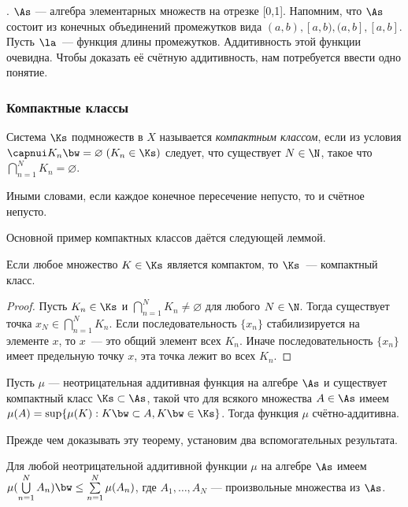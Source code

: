 \documentclass[10pt]{article}
\begin{document}
. $\As$ --- алгебра элементарных множеств на отрезке [0,1].
Напомним, что $\As$ состоит из конечных объединений промежутков вида
$(a,b),[a,b),(a,b],[a,b]$. Пусть $\la$~--- функция длины
промежутков. Аддитивность этой функции очевидна. Чтобы доказать её
счётную аддитивность, нам потребуется ввести одно понятие.

\subsubsection{Компактные классы}

\begin{df}
Система $\Ks$ подмножеств в $X$ называется \emph{компактным
классом}, если из условия $\capnui K_n\bw =\varnothing\;
(K_n\in\Ks)$ следует, что существует $N\in\N$, такое что
$\bigcap\limits_{n=1}^N K_n =\varnothing$.
\end{df}
Иными словами, если каждое конечное пересечение непусто, то и
счётное непусто.

Основной пример компактных классов даётся следующей леммой.

\begin{lemma}Если любое множество $K\in\Ks$ является компактом, то
$\Ks$~--- компактный класс.
\end{lemma}

\begin{proof}
Пусть $K_n\in\Ks$ и $\bigcap\limits_{n=1}^N K_n\ne\varnothing$ для
любого $N\in\N$. Тогда существует точка
$x_N\in\bigcap\limits_{n=1}^N K_n$. Если последовательность
$\{x_n\}$ стабилизируется на элементе $x$, то $x$~--- это общий
элемент всех $K_n$. Иначе последовательность $\{x_n\}$ имеет
предельную точку $x$, эта точка лежит во всех $K_n$.
\end{proof}

\begin{theorem}\label{inf_add_comp}
Пусть $\mu$ --- неотрицательная аддитивная функция на алгебре $\As$
и существует компактный класс $\Ks\subset\As$, такой что для всякого
множества $A\in\As$ имеем $\mu(A)=\sup\{\mu(K): K\bw\subset A,K\bw
\in\Ks\}$. Тогда функция $\mu$ счётно-аддитивна.
\end{theorem}

Прежде чем доказывать эту теорему, установим два вспомогательных
результата.

\begin{prop}\label{semiadd}
Для любой неотрицательной аддитивной функции $\mu$ на алгебре $\As$
имеем $\mu(\bigcup\limits_{n=1}^N A_n)\bw \le \sum\limits_{n=1}^N
\mu(A_n)$, где $A_1,\ldots, A_N$ --- произвольные множества из
$\As$.
\end{prop}
\end{document}
